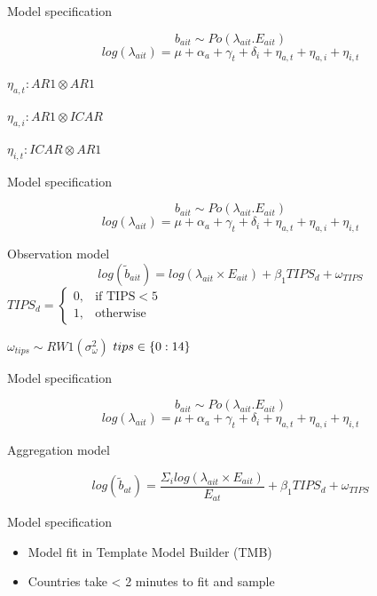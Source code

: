 \documentclass[ignorenonframetext,]{beamer}
\providecommand{\tightlist}{%
  \setlength{\itemsep}{0pt}\setlength{\parskip}{0pt}}
\begin{document}
\begin{frame}[t]{Model specification}
\protect\hypertarget{model-specification-1}{}

\[b_{ait} \sim Po( \lambda_{ait} . E_{ait} )\]
\[log(\lambda_{ait}) = \mu + \alpha_a + \gamma_t + \delta_i + \eta_{a,t} + \eta_{a,i} + \eta_{i,t}\]

\(\eta_{a,t}: AR1 \otimes AR1\)

\(\eta_{a,i}: AR1 \otimes ICAR\)

\(\eta_{i,t}: ICAR \otimes AR1\)

\end{frame}

\begin{frame}[t]{Model specification}
\protect\hypertarget{model-specification-2}{}

\[b_{ait} \sim Po( \lambda_{ait} . E_{ait} )\]
\[log(\lambda_{ait}) = \mu + \alpha_a + \gamma_t + \delta_i + \eta_{a,t} + \eta_{a,i} + \eta_{i,t}\]

Observation model
\[log(\tilde{b}_{ait}) = log(\lambda_{ait} \times E_{ait}) + \beta_1 TIPS_{d} + \omega_{TIPS}\]
\(TIPS_d=\begin{cases} 0, & \text{if TIPS} < 5 \\ 1, & \text{otherwise} \end{cases}\)

\(\omega_{tips} \sim RW1(\sigma^2_\omega)\) \(\hfill tips \in \{0:14\}\)

\end{frame}

\begin{frame}{Model specification}
\protect\hypertarget{model-specification-3}{}

\[b_{ait} \sim Po( \lambda_{ait} . E_{ait} )\]
\[log(\lambda_{ait}) = \mu + \alpha_a + \gamma_t + \delta_i + \eta_{a,t} + \eta_{a,i} + \eta_{i,t}\]

Aggregation model

\[log(\tilde{b}_{at}) = \frac{\Sigma_i log(\lambda_{ait} \times E_{ait})}{E_{at}} + \beta_1 TIPS_{d} + \omega_{TIPS}\]

\end{frame}

\begin{frame}{Model specification}
\protect\hypertarget{model-specification-4}{}

\begin{itemize}
\tightlist
\item
  Model fit in Template Model Builder (TMB)
\item
  Countries take \textless{} 2 minutes to fit and sample
\end{itemize}

\end{frame}
\end{document}
